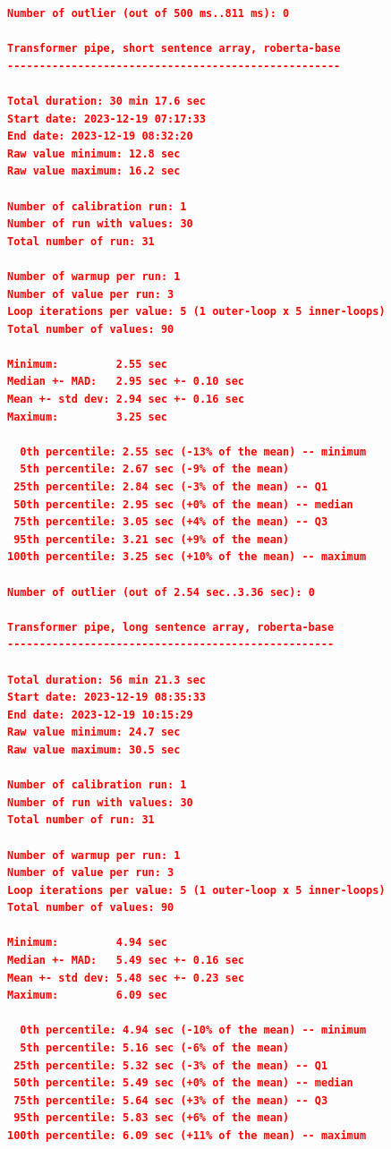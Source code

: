 \begin{lstlisting}[language=json]
Number of outlier (out of 500 ms..811 ms): 0

Transformer pipe, short sentence array, roberta-base
----------------------------------------------------

Total duration: 30 min 17.6 sec
Start date: 2023-12-19 07:17:33
End date: 2023-12-19 08:32:20
Raw value minimum: 12.8 sec
Raw value maximum: 16.2 sec

Number of calibration run: 1
Number of run with values: 30
Total number of run: 31

Number of warmup per run: 1
Number of value per run: 3
Loop iterations per value: 5 (1 outer-loop x 5 inner-loops)
Total number of values: 90

Minimum:         2.55 sec
Median +- MAD:   2.95 sec +- 0.10 sec
Mean +- std dev: 2.94 sec +- 0.16 sec
Maximum:         3.25 sec

  0th percentile: 2.55 sec (-13% of the mean) -- minimum
  5th percentile: 2.67 sec (-9% of the mean)
 25th percentile: 2.84 sec (-3% of the mean) -- Q1
 50th percentile: 2.95 sec (+0% of the mean) -- median
 75th percentile: 3.05 sec (+4% of the mean) -- Q3
 95th percentile: 3.21 sec (+9% of the mean)
100th percentile: 3.25 sec (+10% of the mean) -- maximum

Number of outlier (out of 2.54 sec..3.36 sec): 0

Transformer pipe, long sentence array, roberta-base
---------------------------------------------------

Total duration: 56 min 21.3 sec
Start date: 2023-12-19 08:35:33
End date: 2023-12-19 10:15:29
Raw value minimum: 24.7 sec
Raw value maximum: 30.5 sec

Number of calibration run: 1
Number of run with values: 30
Total number of run: 31

Number of warmup per run: 1
Number of value per run: 3
Loop iterations per value: 5 (1 outer-loop x 5 inner-loops)
Total number of values: 90

Minimum:         4.94 sec
Median +- MAD:   5.49 sec +- 0.16 sec
Mean +- std dev: 5.48 sec +- 0.23 sec
Maximum:         6.09 sec

  0th percentile: 4.94 sec (-10% of the mean) -- minimum
  5th percentile: 5.16 sec (-6% of the mean)
 25th percentile: 5.32 sec (-3% of the mean) -- Q1
 50th percentile: 5.49 sec (+0% of the mean) -- median
 75th percentile: 5.64 sec (+3% of the mean) -- Q3
 95th percentile: 5.83 sec (+6% of the mean)
100th percentile: 6.09 sec (+11% of the mean) -- maximum


\end{lstlisting}
